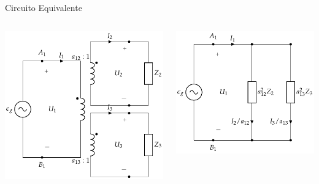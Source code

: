 \documentclass[aspectratio=169, usenames,svgnames,dvipsnames]{beamer}
\begin{document}
\begin{frame}[label={sec:orgbf62e50}]{Circuito Equivalente}
\begin{columns}
\begin{column}{0.5\columnwidth}
\begin{center}
\includegraphics[width=.9\linewidth]{../figs/TrafoIdealVariosDevanados_Impedancia.pdf}
\end{center}
\end{column}

\begin{column}{0.5\columnwidth}
\begin{center}
\includegraphics[width=.9\linewidth]{../figs/TrafoIdealVariosDevanados_Impedancia_Equivalente.pdf}
\end{center}
\end{column}
\end{columns}
\end{frame}
\end{document}
